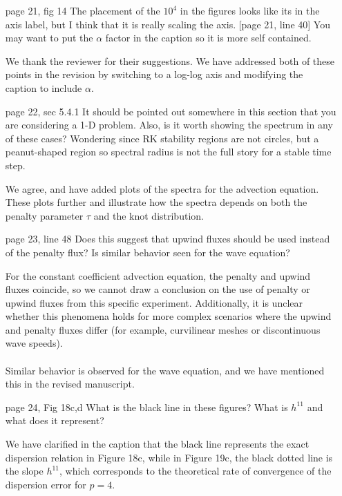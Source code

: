 \documentclass[10pt]{article}
\newcommand{\note}[1]{{\color{violet}#1}}
\begin{document}
\begin{enumerate}
\begin{enumerate}
\item [page 21, fig 14] The placement of the $10^4$ in the figures looks like its in the axis label, but I think that it is really scaling the axis.  [page 21, line 40] You may want to put the $\alpha$ factor in the caption so it is more self contained.

\note{We thank the reviewer for their suggestions.  We have addressed both of these points in the revision by switching to a log-log axis and modifying the caption to include $\alpha$.}

\item [page 22, sec 5.4.1] It should be pointed out somewhere in this section that you are considering a 1-D problem. Also, is it worth showing the spectrum in any of these cases? Wondering since RK stability regions are not circles, but a peanut-shaped region so spectral radius is not the full story for a stable time step.  

\note{We agree, and have added plots of the spectra for the advection equation.  These plots further and illustrate how the spectra depends on both the penalty parameter $\tau$ and the knot distribution.}

\item [page 23, line 48] Does this suggest that upwind fluxes should be used instead of the penalty flux? Is similar behavior seen for the wave equation?

\note{For the constant coefficient advection equation, the penalty and upwind fluxes coincide, so we cannot draw a conclusion on the use of penalty or upwind fluxes from this specific experiment.  Additionally, it is unclear whether this phenomena holds for more complex scenarios where the upwind and penalty fluxes differ (for example, curvilinear meshes or discontinuous wave speeds).  
\\
\\
Similar behavior is observed for the wave equation, and we have mentioned this in the revised manuscript.}

\item [page 24, Fig 18c,d] What is the black line in these figures? What is $h^{11}$ and what does it represent?  

\note{We have clarified in the caption that the black line represents the exact dispersion relation in Figure 18c, while in Figure 19c, the black dotted line is the slope $h^{11}$, which corresponds to the theoretical rate of convergence of the dispersion error for $p=4$.}


\end{enumerate}
\end{enumerate}
\end{document}
